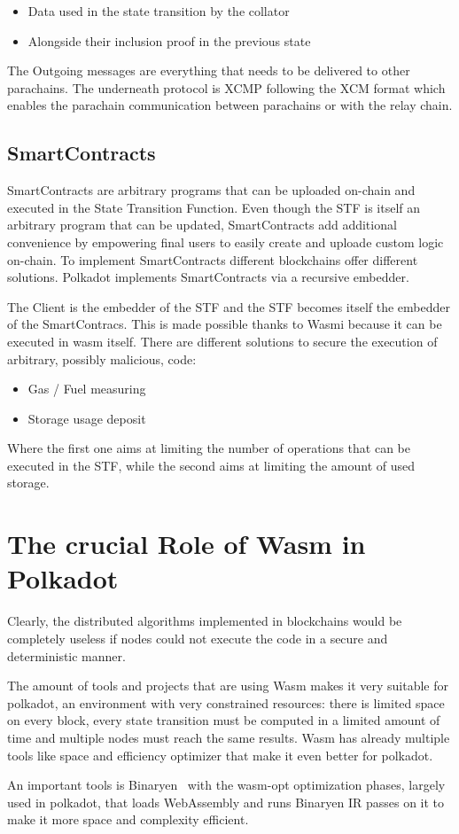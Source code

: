 \begin{itemize}
  \item Data used in the state transition by the collator
  \item Alongside their inclusion proof in the previous state
\end{itemize}

The Outgoing messages are everything that needs to be delivered to other parachains. The underneath protocol is XCMP following the XCM format which enables the parachain communication between parachains or with the relay chain.

\subsection{SmartContracts}

SmartContracts are arbitrary programs that can be uploaded on-chain and executed in the State Transition Function. Even though the STF is itself an arbitrary program that can be updated, SmartContracts add additional convenience by empowering final users to easily create and uploade custom logic on-chain. To implement SmartContracts different blockchains offer different solutions. Polkadot implements SmartContracts via a recursive embedder.


The Client is the embedder of the STF and the STF becomes itself the embedder of the SmartContracs. This is made possible thanks to Wasmi because it can be executed in wasm itself. There are different solutions to secure the execution of arbitrary, possibly malicious, code:

\begin{itemize}
  \item Gas / Fuel measuring
  \item Storage usage deposit
\end{itemize}

Where the first one aims at limiting the number of operations that can be executed in the STF, while  the second aims at limiting the amount of used storage.

\section{The crucial Role of Wasm in Polkadot}

Clearly, the distributed algorithms implemented in blockchains would be completely useless if nodes could not execute the code in a secure and deterministic manner.

The amount of tools and projects that are using Wasm makes it very suitable for polkadot, an environment with very constrained resources: there is limited space on every block, every state transition must be computed in a limited amount of time and multiple nodes must reach the same results. Wasm has already multiple tools like space and efficiency optimizer that make it even better for polkadot.

An important tools is Binaryen~\cite{binaryen} with the wasm-opt optimization phases, largely used in polkadot, that loads WebAssembly and runs Binaryen IR passes on it to make it more space and complexity efficient.


